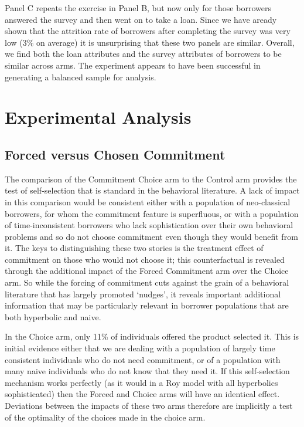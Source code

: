 \documentclass[oneside,11pt]{article}
\begin{document}
Panel C repeats the exercise in Panel B, but now only for those borrowers answered the survey and then went on to take a loan.  Since we have aready shown that the attrition rate of borrowers after completing the survey was very low (3\% on average) it is unsurprising that these two panels are similar.  Overall, we find both the loan attributes and the survey attributes of borrowers to be similar across arms.  The experiment appears to have been successful in generating a balanced sample for analysis.






 


\section{Experimental Analysis} \label{experiment}


\subsection{Forced versus Chosen Commitment} \label{forced_vs_choice}



The comparison of the Commitment Choice arm to the Control arm provides the test of self-selection that is standard in the behavioral literature.  A lack of impact in this comparison would be consistent either with a population of neo-classical borrowers, for whom the commitment feature is superfluous, or with a population of time-inconsistent borrowers who lack sophistication over their own behavioral problems and so do not choose commitment even though they would benefit from it.  The keys to distinguishing these two stories is the treatment effect of commitment on those who would not choose it; this counterfactual is revealed through the additional impact of the Forced Commitment arm over the Choice arm.  So while the forcing of commitment cuts against the grain of a behavioral literature that has largely promoted `nudges', it reveals important additional information that may be particularly relevant in borrower populations that are both hyperbolic and naive.


In the Choice arm, only 11\% of individuals offered the product selected it. This is initial evidence either that we are dealing with a population of largely time consistent individuals who do not need commitment, or of a population with many naive individuals who do not know that they need it.  If this self-selection mechanism works perfectly (as it would in a Roy model with all hyperbolics sophisticated) then the Forced and Choice arms will have an identical effect.  Deviations between the impacts of these two arms therefore are implicitly a test of the optimality of the choices made in the choice arm.  
\end{document}
